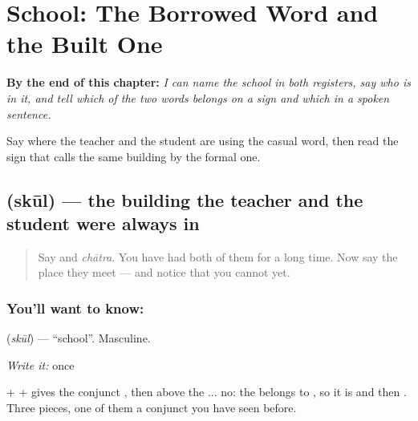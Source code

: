 
\chapter{School: The Borrowed Word and the Built One}
\label{ch:hi-skool-vidyalaya}

\begin{chapteropening}
\textbf{By the end of this chapter:} \emph{I can name the school in both registers, say who is in it, and tell which of the two words belongs on a sign and which in a spoken sentence.}

Say where the teacher and the student are using the casual word, then read the sign that calls the same building by the formal one.
\end{chapteropening}

\section[\texorpdfstring{\hi{स्कूल} (skūl)}{स्कूल (skūl)}]{ (skūl) — the building the teacher and the student were always in}

\label{lesson:HI-C81-skool}



\begin{quote}
Say \textbf{} and \emph{chātra}. You have had both of them for a long time. Now say the place they meet — and notice that you cannot yet.
\end{quote}

\subsection*{You'll want to know: }
\textbf{} (\emph{skūl}) — \textquotedblleft{}school\textquotedblright{}. Masculine.

\emph{Write it:} \textbf{} once

 +  +  gives the conjunct \textbf{}, then  above the ... no: the  belongs to , so it is \textbf{} and then \textbf{}. Three pieces, one of them a conjunct you have seen before.

